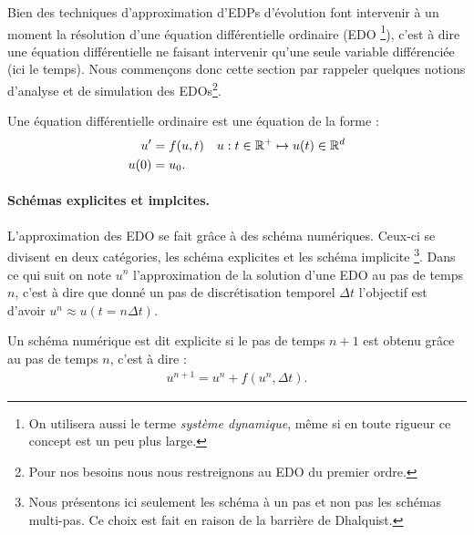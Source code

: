 Bien des techniques d'approximation d'EDPs d'évolution font intervenir à un moment la résolution d'une équation différentielle ordinaire (EDO
\footnote{On utilisera aussi le terme \textit{système dynamique}, même si en toute rigueur ce concept est un peu plus large.}),
c'est à dire une équation différentielle ne faisant intervenir qu'une seule variable différenciée (ici le temps). Nous commençons donc cette section par rappeler 
quelques notions d'analyse et de simulation des EDOs\footnote{Pour nos besoins nous nous restreignons au EDO du premier ordre.}.\par

\begin{definition}
    Une équation différentielle ordinaire est une équation de la forme :
    \begin{align}
        u' &= f(u,t)\quad u : t \in \mathbb{R}^+ \mapsto u(t) \in \mathbb{R}^d\\\notag
        u(0)&=u_0.
    \end{align}
\end{definition}
\paragraph{Schémas explicites et implcites.}
L'approximation des EDO se fait grâce à des schéma numériques. Ceux-ci se divisent en deux catégories, les schéma explicites et les schéma implicite
\footnote{Nous présentons ici seulement les schéma à un pas et non pas les schémas multi-pas. Ce choix est fait en raison de la barrière de Dhalquist.}.
Dans ce qui suit on note $u^n$ l'approximation de la solution d'une EDO au pas de temps $n$, c'est à dire que donné un pas de discrétisation temporel $\Delta t$
l'objectif est d'avoir $u^n \approx u(t=n\Delta t)$.

\begin{definition}
    Un schéma numérique est dit explicite si le pas de temps $n+1$ est obtenu grâce au pas de temps $n$, c'est à dire : 
    \begin{align}
        u^{n+1} = u^n + f(u^n ,\Delta t ).
    \end{align}
\end{definition}

